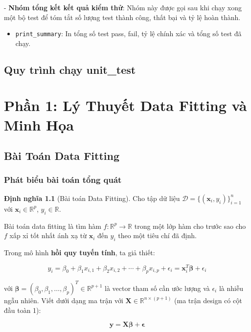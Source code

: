 \documentclass[12pt,a4paper]{report}
\begin{document}
- \textbf{Nhóm tổng kết kết quả kiểm thử}:
Nhóm này được gọi sau khi chạy xong một bộ test để tóm tắt số lượng test thành công, thất bại và tỷ lệ hoàn thành.
\begin{itemize}
    \item \texttt{print\_summary}: In tổng số test pass, fail, tỷ lệ chính xác và tổng số test đã chạy.
\end{itemize}

\section{Quy trình chạy unit\_test}
\clearpage
\chapter{Phần 1: Lý Thuyết Data Fitting và Minh Họa}

\section{Bài Toán Data Fitting}

\subsection{Phát biểu bài toán tổng quát}

\textbf{Định nghĩa 1.1} (Bài toán Data Fitting).
Cho tập dữ liệu
$\mathcal{D} = \{(\mathbf{x}_i, y_i)\}_{i=1}^{n}$
với $\mathbf{x}_i \in \mathbb{R}^p$, $y_i \in \mathbb{R}$.

Bài toán data fitting là tìm hàm
$f: \mathbb{R}^p \to \mathbb{R}$
trong một lớp hàm cho trước sao cho $f$
xấp xỉ tốt nhất ánh xạ từ $\mathbf{x}_i$ đến $y_i$
theo một tiêu chí đã định.

Trong mô hình \textbf{hồi quy tuyến tính}, ta giả thiết:

\begin{equation}
  y_i = \beta_0 + \beta_1 x_{i,1} + \beta_2 x_{i,2} + \cdots + \beta_p x_{i,p} + \epsilon_i
      = \mathbf{x}_i^T \boldsymbol{\beta} + \epsilon_i
\end{equation}

với $\boldsymbol{\beta} = (\beta_0, \beta_1, \dots, \beta_p)^T \in \mathbb{R}^{p+1}$
là vector tham số cần ước lượng và $\epsilon_i$ là nhiễu ngẫu nhiên.
Viết dưới dạng ma trận với $\mathbf{X} \in \mathbb{R}^{n \times (p+1)}$
(ma trận design có cột đầu toàn 1):

\begin{equation}
  \mathbf{y} = \mathbf{X}\boldsymbol{\beta} + \boldsymbol{\epsilon}
\end{equation}
\end{document}
